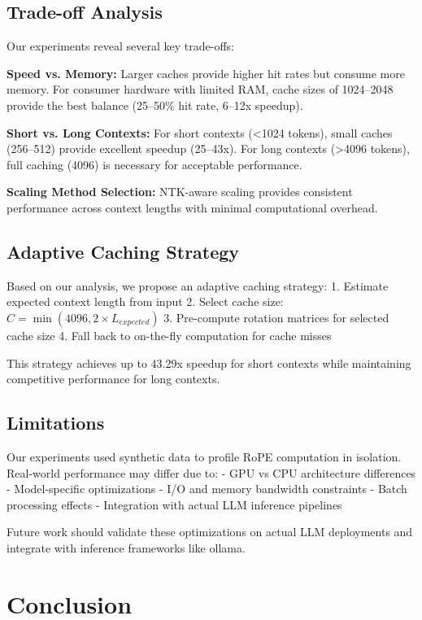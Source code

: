 \documentclass[conference]{IEEEtran}
\begin{document}
\subsection{Trade-off Analysis}

Our experiments reveal several key trade-offs:

\textbf{Speed vs. Memory:} Larger caches provide higher hit rates but consume more memory. For consumer hardware with limited RAM, cache sizes of 1024--2048 provide the best balance (25--50\% hit rate, 6--12x speedup).

\textbf{Short vs. Long Contexts:} For short contexts (<1024 tokens), small caches (256--512) provide excellent speedup (25--43x). For long contexts (>4096 tokens), full caching (4096) is necessary for acceptable performance.

\textbf{Scaling Method Selection:} NTK-aware scaling provides consistent performance across context lengths with minimal computational overhead.

\subsection{Adaptive Caching Strategy}

Based on our analysis, we propose an adaptive caching strategy:
1. Estimate expected context length from input
2. Select cache size: $C = \min(4096, 2 \times L_{expected})$
3. Pre-compute rotation matrices for selected cache size
4. Fall back to on-the-fly computation for cache misses

This strategy achieves up to 43.29x speedup for short contexts while maintaining competitive performance for long contexts.

\subsection{Limitations}

Our experiments used synthetic data to profile RoPE computation in isolation. Real-world performance may differ due to:
- GPU vs CPU architecture differences
- Model-specific optimizations
- I/O and memory bandwidth constraints
- Batch processing effects
- Integration with actual LLM inference pipelines

Future work should validate these optimizations on actual LLM deployments and integrate with inference frameworks like ollama.

\section{Conclusion}
\end{document}
